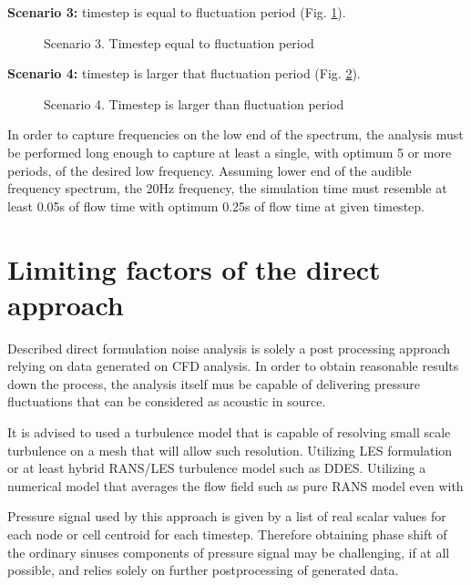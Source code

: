 \textbf{Scenario 3:} timestep is equal to fluctuation period (Fig. \ref{time3}).

\begin{figure}[h!]
\centering %
\caption{Scenario 3. Timestep equal to fluctuation period}
\label{time3}
\end{figure}

\textbf{Scenario 4:} timestep is larger that fluctuation period (Fig. \ref{time4}).

\begin{figure}[h!]
\centering %
\caption{Scenario 4. Timestep is larger than fluctuation period}
\label{time4}
\end{figure}

In order to capture frequencies on the low end of the spectrum, the analysis must be performed long enough to capture at least a single, with optimum 5 or more periods, of the desired low frequency. Assuming lower end of the audible frequency spectrum, the 20Hz frequency, the simulation time must resemble at least 0.05s of flow time with optimum 0.25s of flow time at given timestep.


\section{Limiting factors of the direct approach} \label{limits}
Described direct formulation noise analysis is solely a post processing approach relying on data generated on CFD analysis. In order to obtain reasonable results down the process, the analysis itself mus be capable of delivering pressure fluctuations that can be considered as acoustic in source. 

It is advised to used a turbulence model that is capable of resolving small scale turbulence on a mesh that will allow such resolution. Utilizing LES formulation or at least hybrid RANS/LES turbulence model such as DDES. Utilizing a numerical model that averages the flow field such as pure RANS model even with  

Pressure signal used by this approach is given by a list of real scalar values for each node or cell centroid for each timestep. Therefore obtaining phase shift of the ordinary sinuses components of pressure signal may be challenging, if at all possible, and relies solely on further postprocessing of generated data. 

